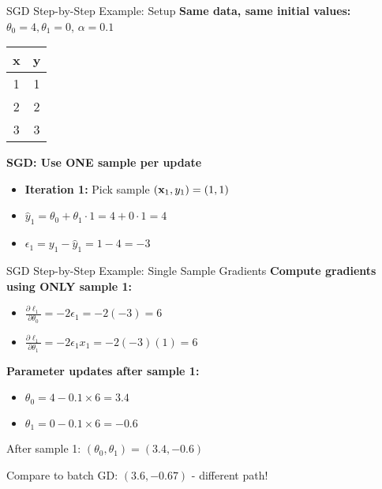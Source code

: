 \documentclass[usenames,dvipsnames]{beamer}
\begin{document}
  \begin{frame}{SGD Step-by-Step Example: Setup}
    \textbf{Same data, same initial values:} $\theta_0 = 4, \theta_1 = 0$, $\alpha = 0.1$
    
    \begin{center}
    \begin{tabular}{|c|c|}
        \hline
        \textbf{x} & \textbf{y} \\
        \hline
        1 & 1 \\
        2 & 2 \\
        3 & 3 \\
        \hline
    \end{tabular}
    \end{center}
    
    \pause
    \textbf{SGD: Use ONE sample per update}
    \begin{itemize}[<+->]
        \item \textbf{Iteration 1:} Pick sample $(\mathbf{x}_1, y_1) = (1, 1)$
        \item $\hat{y}_1 = \theta_0 + \theta_1 \cdot 1 = 4 + 0 \cdot 1 = 4$
        \item $\epsilon_1 = y_1 - \hat{y}_1 = 1 - 4 = -3$
    \end{itemize}
  \end{frame}

  \begin{frame}{SGD Step-by-Step Example: Single Sample Gradients}
    \textbf{Compute gradients using ONLY sample 1:}
    \begin{itemize}[<+->]
        \item $\frac{\partial \ell_1}{\partial \theta_0} = -2\epsilon_1 = -2(-3) = 6$
        \item $\frac{\partial \ell_1}{\partial \theta_1} = -2\epsilon_1 x_1 = -2(-3)(1) = 6$
    \end{itemize}
    
    \pause
    \textbf{Parameter updates after sample 1:}
    \begin{itemize}[<+->]
        \item $\theta_0 = 4 - 0.1 \times 6 = 3.4$
        \item $\theta_1 = 0 - 0.1 \times 6 = -0.6$
    \end{itemize}
    
    \pause
    \begin{keypointsbox}{}
    After sample 1: $(\theta_0, \theta_1) = (3.4, -0.6)$
    
    Compare to batch GD: $(3.6, -0.67)$ - different path!
    \end{keypointsbox}
  \end{frame}
\end{document}
